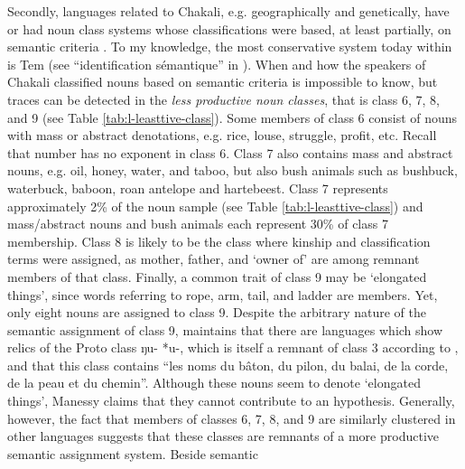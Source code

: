 \begin{exe}
\begin{exe}
\begin{exe}
\begin{exe}
\begin{exe}
\begin{exe}
Secondly, languages related to Chakali, e.g. geographically and genetically,  
 have or had noun class systems whose classifications were based, at least 
partially, on semantic criteria \citep{nade82}. To my knowledge, the most conservative system 
today  within  is Tem (see  ``identification sémantique'' in 
\citealt{Tcha07}). When and how the speakers of Chakali  classified nouns based on 
semantic criteria is impossible to know,  but traces can be detected in  the   
{\it less productive noun classes}, that is class 6, 7, 8, and 9 (see Table 
\ref{tab:l-leasttive-class}). Some members 
of class 6 consist of nouns with mass or abstract  denotations, e.g. rice,  
louse, struggle, profit, etc.  Recall that number has no exponent in class 6.  Class 7 also 
contains mass and abstract nouns, 
e.g. oil,  honey, water, and taboo, but also bush animals such as bushbuck, 
waterbuck, baboon, roan antelope and hartebeest. Class 7 represents 
approximately 2\% of the noun sample (see Table \ref{tab:l-leasttive-class}) and 
 mass/abstract nouns and bush animals each represent 30\% of class 7 
membership. Class 8 is likely to be the class where kinship and  
classification terms were assigned, as mother, father, and `owner of' are among 
remnant members of that class.  Finally, a  common trait of class 9 may be 
`elongated things', since words referring to  rope, arm, tail, and ladder are 
members. Yet, only eight nouns are assigned to class 9. Despite the arbitrary 
nature of the semantic assignment of class 9,  \citet[94]{Mane75} maintains that 
there are  languages which show relics of  the Proto  class 
{\sls *ŋu- *u-}, which is  itself a remnant of  class 3   according to 
\citet[11]{Mieh07}, and that this class contains ``les noms du bâton, du pilon, 
du balai, de la corde, de la peau et du chemin''.  Although these nouns seem to 
denote `elongated  things',   Manessy claims that they cannot contribute to an 
hypothesis. Generally, however, the fact that members of classes 6, 7, 8, and 9 
are similarly clustered in other languages suggests that these classes are 
remnants of a more productive semantic assignment system. Beside semantic 

\end{exe}
\end{exe}
\end{exe}
\end{exe}
\end{exe}
\end{exe}
